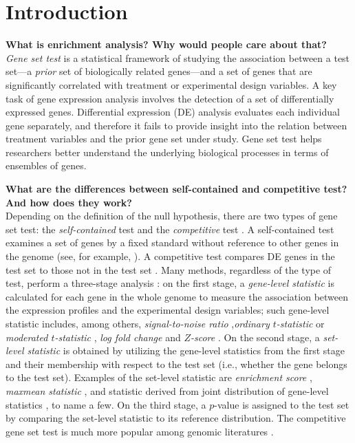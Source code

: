 \documentclass[useAMS,usenatbib, galley]{biom}
\begin{document}
	\section{Introduction}\label{section:introduction}
	
	\textbf{What is enrichment analysis? Why would people care about that?}\\
	\textit{Gene set test} is a statistical framework of studying the association between a test set---a \textit{prior} set of biologically related genes---and a set of genes that are significantly correlated with treatment or experimental design variables. A key task of gene expression analysis involves the detection of a set of differentially expressed genes. Differential expression (DE) analysis  evaluates each individual gene separately, and therefore it fails to provide insight into the relation between treatment variables and the prior gene set under study. Gene set test helps researchers better understand the underlying biological processes in terms of ensembles of genes.
	
	\textbf{What are the differences between self-contained and competitive test? And how does they work?}\\
	Depending on the definition of the null hypothesis, there are two types of gene set test: the \textit{self-contained} test and the \textit{competitive} test \citep{goeman2007analyzing}. A self-contained test examines a set of genes by a fixed standard without reference to other genes in the genome (see, for example, \cite{goeman2004global,goeman2005testing, tsai2009multivariate, wu2010roast, huang2013gene}). A competitive test compares DE
	genes in the test set to those not in the test set \citep{tian2005discovering, wu2012camera, yaari2013quantitative}. Many methods, regardless of the type of test, perform a three-stage analysis \citep{khatri2012ten}: on the first stage, a \textit{gene-level statistic} is calculated for each gene in the whole genome to measure the association between the expression profiles and the experimental design variables; such gene-level statistic includes, among others, \textit{signal-to-noise ratio} \citep{subramanian2005gene},\textit{ordinary $t$-statistic} \citep{tian2005discovering} or \textit{moderated $t$-statistic} \citep{Smyth2004moderated}, \textit{log fold change} \citep{kim2005page} and \textit{$Z$-score} \citep{efron2007correlation}. On the second stage, a \textit{set-level statistic} is obtained by utilizing the gene-level statistics from the first stage and their membership with respect to the test set (i.e., whether the gene belongs to the test set). Examples of the set-level statistic are \textit{enrichment score} \citep{subramanian2005gene}, \textit{maxmean statistic} \citep{efron2007testing}, and statistic derived from joint distribution of gene-level statistics \citep{yaari2013quantitative}, to name a few. On the third stage, a $p$-value is assigned to the test set by comparing the set-level statistic to its reference distribution. The competitive gene set test is much more popular among genomic literatures \citep{goeman2007analyzing, gatti2010heading}.  
	
\end{document}

